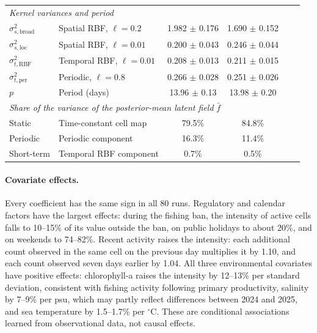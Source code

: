 \begin{table}[t]
\begin{tabular}{llcccc}
\midrule
\multicolumn{6}{l}{\textit{Kernel variances and period}} \\
$\sigma^2_{s,\mathrm{broad}}$ & Spatial RBF, $\ell=0.2$ & 1.982 $\pm$ 0.176 & 1.690 $\pm$ 0.152 & & \\
$\sigma^2_{s,\mathrm{loc}}$ & Spatial RBF, $\ell=0.01$ & 0.200 $\pm$ 0.043 & 0.246 $\pm$ 0.044 & & \\
$\sigma^2_{t,\mathrm{RBF}}$ & Temporal RBF, $\ell=0.01$ & 0.208 $\pm$ 0.013 & 0.211 $\pm$ 0.015 & & \\
$\sigma^2_{t,\mathrm{per}}$ & Periodic, $\ell=0.8$ & 0.266 $\pm$ 0.028 & 0.251 $\pm$ 0.026 & & \\
$p$ & Period (days) & 13.96 $\pm$ 0.13 & 13.98 $\pm$ 0.20 & & \\
\midrule
\multicolumn{6}{l}{\textit{Share of the variance of the posterior-mean latent field} $\bar f$} \\
Static & Time-constant cell map & 79.5\% & 84.8\% & & \\
Periodic & Periodic component & 16.3\% & 11.4\% & & \\
Short-term & Temporal RBF component & 0.7\% & 0.5\% & & \\
\bottomrule
\end{tabular}
\end{table}

\paragraph{Covariate effects.}
Every coefficient has the same sign in all 80 runs. Regulatory and calendar factors have the largest effects: during the fishing ban, the intensity of active cells falls to 10--15\% of its value outside the ban, on public holidays to about 20\%, and on weekends to 74--82\%. Recent activity raises the intensity: each additional count observed in the same cell on the previous day multiplies it by 1.10, and each count observed seven days earlier by 1.04. All three environmental covariates have positive effects: chlorophyll-a raises the intensity by 12--13\% per standard deviation, consistent with fishing activity following primary productivity, salinity by 7--9\% per psu, which may partly reflect differences between 2024 and 2025, and sea temperature by 1.5--1.7\% per $^\circ$C. These are conditional associations learned from observational data, not causal effects.

